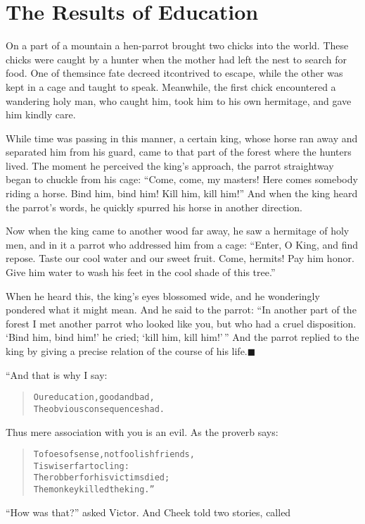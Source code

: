 \documentclass[article, twoside, 14pt]{memoir}
\newcommand{\qed}{\hfill \ensuremath{\blacksquare}}
\renewenvironment{verbatim}{%
\begin{quote}%
\vskip -10pt%
\begin{alltt}\normalfont\large}{\end{alltt}%
\end{quote}%
\vskip -10pt
} %
\begin{document}
\chapter{The Results of Education}

\label{s32}

On a part of a mountain a hen-parrot brought two chicks into the
world. These chicks were caught by a hunter when the mother had
left the nest to search for food. One of them{\textemdash}since fate decreed
it{\textemdash}contrived to escape, while the other was kept in a cage and
taught to speak. Meanwhile, the first chick encountered a wandering
holy man, who caught him, took him to his own hermitage, and gave
him kindly care.

While time was passing in this manner, a certain king, whose horse
ran away and separated him from his guard, came to that part of the
forest where the hunters lived. The moment he perceived the king's
approach, the parrot straightway began to chuckle from his cage:
``Come, come, my masters! Here comes somebody riding a horse. Bind him, bind him! Kill him, kill him!''
And when the king heard the parrot's words, he quickly spurred his
horse in another direction.

Now when the king came to another wood far away, he saw a hermitage
of holy men, and in it a parrot who addressed him from a cage:
``Enter, O King, and find repose. Taste our cool water and our sweet fruit. Come, hermits! Pay him honor. Give him water to wash his feet in the cool shade of this tree.''

When he heard this, the king's eyes blossomed wide, and he
wonderingly pondered what it might mean. And he said to the parrot:
``In another part of the forest I met another parrot who looked like you, but who had a cruel disposition. `Bind him, bind him!' he cried; `kill him, kill him!'\,''
And the parrot replied to the king by giving a precise relation of
the course of his life.\hyperref[s32]{\qed}

“And that is why I say:

\begin{verbatim}
Our education, good and bad,
The obvious consequences had.
\end{verbatim}
Thus mere association with you is an evil. As the proverb says:

\begin{verbatim}
To foes of sense, not foolish friends,
    Tis wiser far to cling:
The robber for his victims died;
    The monkey killed the king.”
\end{verbatim}
``How was that?'' asked Victor. And Cheek told two stories, called
\end{document}
